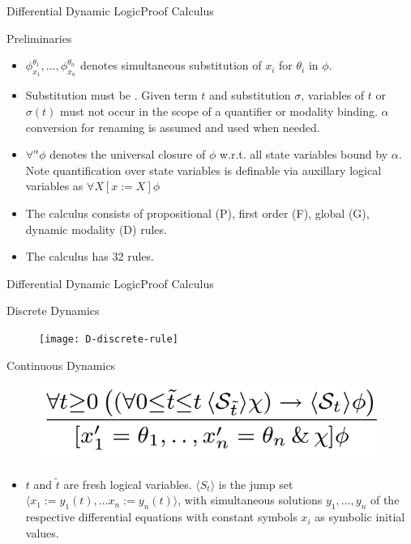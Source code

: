 \documentclass{beamer}
\begin{document}
\begin{frame}{Differential Dynamic Logic}{Proof Calculus}
  \begin{block}{Preliminaries}
    \begin{itemize}
      \item $\phi_{x_1}^{\theta_1}, \ldots, \phi_{x_n}^{\theta_n}$ denotes
        simultaneous substitution of $x_i$ for $\theta_i$ in $\phi$.
      \item Substitution must be . Given term $t$ and
        substitution $\sigma$, variables of $t$ or $\sigma(t)$ must not occur in
        the scope of a quantifier or modality binding. $\alpha$ conversion for
        renaming is assumed and used when needed.
      \item $\forall^{\alpha}\phi$ denotes the universal closure of $\phi$
        w.r.t. all state variables bound by $\alpha$. Note
        quantification over state variables is definable
        via auxillary logical variables as $\forall X [x := X] \phi$
      \item The calculus consists of propositional (P), first order (F),
        global (G), dynamic modality (D) rules.
      \item The calculus has 32 rules.
    \end{itemize}
  \end{block}
\end{frame}
\begin{frame}{Differential Dynamic Logic}{Proof Calculus}
  \begin{block}{Discrete Dynamics}
  \begin{figure}
    \centering
    \texttt{[image: D-discrete-rule]}
  \end{figure}
\end{block}
  \begin{block}{Continuous Dynamics}
  \begin{figure}
    \centering
    \includegraphics[scale=0.5]{D-continuous-rule}
  \end{figure}
  \begin{itemize}
    \item $t$ and $\tilde{t}$ are fresh logical variables. $\langle S_t \rangle$ is the jump set
      $\langle x_1 := y_1(t), \dots x_n := y_n(t) \rangle$, with simultaneous
      solutions $y_1, \ldots, y_n$ of the respective differential equations with
      constant symbols $x_i$ as symbolic initial values.
  \end{itemize}
\end{block}
\end{frame}
\end{document}
